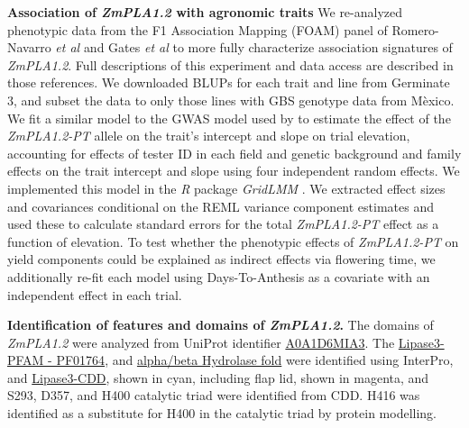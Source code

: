 \documentclass[9pt,twocolumn,twoside,lineno]{BioRxiv}
\begin{document}
\textbf{Association of \textit{ZmPLA1.2} with agronomic traits}
We re-analyzed phenotypic data from the F1 Association Mapping (FOAM) panel of Romero-Navarro \textit{et al} \cite{Romero_Navarro2017-cn} and Gates \textit{et al} \cite{Gates2019-xu} to more fully characterize association signatures of \textit{ZmPLA1.2}. 
Full descriptions of this experiment and data access are described in those references. 
We downloaded BLUPs for each trait and line from Germinate 3, and subset the data to only those lines with GBS genotype data from M\`exico. 
We fit a similar model to the GWAS model used by \cite{Gates2019-xu} to estimate the effect of the \textit{ZmPLA1.2-PT} allele on the trait's intercept and slope on trial elevation, accounting for effects of tester ID in each field and genetic background and family effects on the trait intercept and slope using four independent random effects. 
We implemented this model in the \textit{R} package \textit{GridLMM} \cite{Runcie2019-Gr}. 
We extracted effect sizes and covariances conditional on the REML variance component estimates and used these to calculate standard errors for the total \textit{ZmPLA1.2-PT} effect as a function of elevation. 
To test whether the phenotypic effects of \textit{ZmPLA1.2-PT} on yield components could be explained as indirect effects via flowering time, we additionally re-fit each model using Days-To-Anthesis as a covariate with an independent effect in each trial.

\textbf{Identification of features and domains of \textit{ZmPLA1.2}.}
The domains of \textit{ZmPLA1.2} were analyzed from UniProt identifier \hyperlink{https://www.uniprot.org/uniprot/A0A1D6MIA3}{A0A1D6MIA3}. 
The \hyperlink{https://www.ebi.ac.uk/interpro/entry/pfam/PF01764/}{Lipase3-PFAM - PF01764}, and \hyperlink{https://www.ebi.ac.uk/interpro/entry/InterPro/IPR029058/}{alpha/beta Hydrolase fold} were identified using InterPro, and \hyperlink{https://www.ncbi.nlm.nih.gov/Structure/cdd/cddsrv.cgi?uid=cd00519}{Lipase3-CDD}, shown in cyan, including flap lid, shown in magenta, and S293, D357, and H400 catalytic triad were identified from CDD. 
H416 was identified as a substitute for H400 in the catalytic triad by protein modelling.
\end{document}
